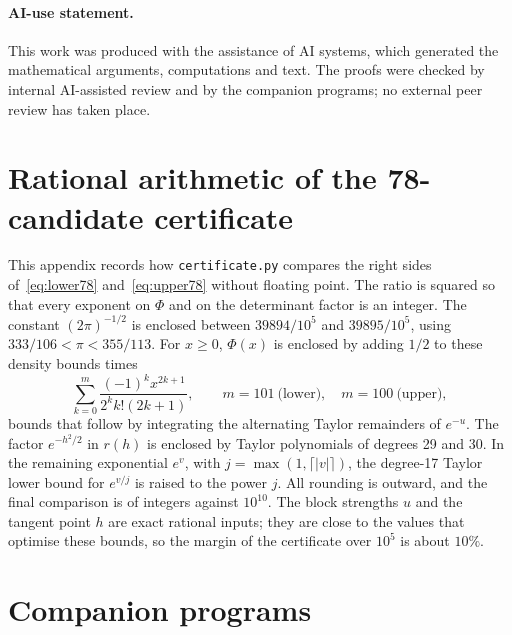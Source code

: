 \documentclass[11pt,a4paper]{article}
\theoremstyle{definition}
\begin{document}
\paragraph{AI-use statement.} This work was produced with the assistance of AI systems, which generated the mathematical arguments, computations and text. The proofs were checked by internal AI-assisted review and by the companion programs; no external peer review has taken place.

\appendix

\section{Rational arithmetic of the 78-candidate certificate}\label{app:certificate}

This appendix records how \texttt{certificate.py} compares the right sides of~\eqref{eq:lower78} and~\eqref{eq:upper78} without floating point. The ratio is squared so that every exponent on $\Phi$ and on the determinant factor is an integer. The constant $(2\pi)^{-1/2}$ is enclosed between $39894/10^5$ and $39895/10^5$, using $333/106<\pi<355/113$. For $x\ge0$, $\Phi(x)$ is enclosed by adding $1/2$ to these density bounds times
\[
 \sum_{k=0}^m\frac{(-1)^k x^{2k+1}}{2^k k!(2k+1)},
 \qquad m=101\ \text{(lower)},\quad m=100\ \text{(upper)},
\]
bounds that follow by integrating the alternating Taylor remainders of $e^{-u}$. The factor $e^{-h^2/2}$ in $r(h)$ is enclosed by Taylor polynomials of degrees 29 and 30. In the remaining exponential $e^v$, with $j=\max(1,\lceil |v|\rceil)$, the degree-17 Taylor lower bound for $e^{v/j}$ is raised to the power $j$. All rounding is outward, and the final comparison is of integers against $10^{10}$. The block strengths $u$ and the tangent point $h$ are exact rational inputs; they are close to the values that optimise these bounds, so the margin of the certificate over $10^5$ is about $10\%$.

\section{Companion programs}\label{app:code}
\end{document}
